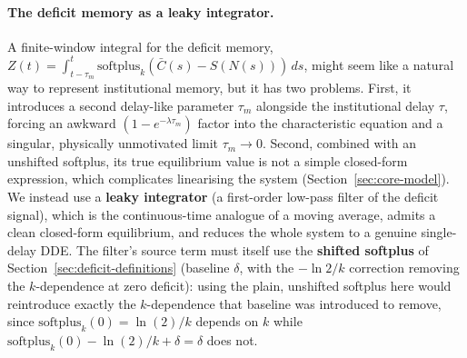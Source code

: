 \documentclass[twocolumn,10pt]{article}
\begin{document}
\paragraph{The deficit memory as a leaky integrator.} A finite-window integral for the deficit memory, $Z(t)=\int_{t-\tau_m}^t\text{softplus}_k(\bar C(s)-S(N(s)))\,ds$, might seem like a natural way to represent institutional memory, but it has two problems. First, it introduces a second delay-like parameter $\tau_m$ alongside the institutional delay $\tau$, forcing an awkward $(1-e^{-\lambda\tau_m})$ factor into the characteristic equation and a singular, physically unmotivated limit $\tau_m\to0$. Second, combined with an unshifted softplus, its true equilibrium value is not a simple closed-form expression, which complicates linearising the system (Section~\ref{sec:core-model}). We instead use a \textbf{leaky integrator} (a first-order low-pass filter of the deficit signal), which is the continuous-time analogue of a moving average, admits a clean closed-form equilibrium, and reduces the whole system to a genuine single-delay DDE. The filter's source term must itself use the \textbf{shifted softplus} of Section~\ref{sec:deficit-definitions} (baseline $\delta$, with the $-\ln2/k$ correction removing the $k$-dependence at zero deficit): using the plain, unshifted softplus here would reintroduce exactly the $k$-dependence that baseline was introduced to remove, since $\text{softplus}_k(0)=\ln(2)/k$ depends on $k$ while $\text{softplus}_k(0)-\ln(2)/k+\delta=\delta$ does not.
\end{document}

